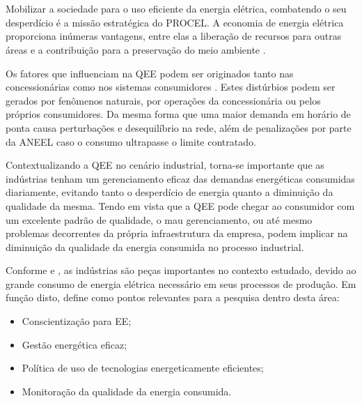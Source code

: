 \cleardoublepage
\pagestyle{fancy}
\setcounter{page}{9}
\chapter{\capum}\label{intro}
\par
Mobilizar a sociedade para o uso eficiente da energia elétrica, combatendo o seu desperdício é a missão estratégica do \ac{PROCEL}. A economia de energia elétrica proporciona inúmeras vantagens, entre elas a liberação de recursos para outras áreas e a contribuição para a preservação do meio ambiente \cite{ELE10}.
\par
Os fatores que influenciam na \ac{QEE} podem ser originados tanto nas concessionárias como nos sistemas consumidores \cite{MEL08}. Estes distúrbios podem ser gerados por fenômenos naturais, por operações da concessionária ou pelos próprios consumidores. Da mesma forma que uma maior demanda em horário de ponta causa perturbações e desequilíbrio na rede, além de penalizações por parte da \ac{ANEEL} caso o consumo ultrapasse o limite contratado. 
\par
Contextualizando a \acl{QEE} no cenário industrial, torna-se importante que as indústrias tenham um gerenciamento eficaz das demandas energéticas consumidas diariamente, evitando tanto o desperdício de energia quanto a diminuição da qualidade da mesma. Tendo em vista que a QEE pode chegar ao consumidor com um excelente padrão de qualidade, o mau gerenciamento, ou até mesmo problemas decorrentes da própria infraestrutura da empresa, podem implicar na diminuição da qualidade da energia consumida no processo industrial. 
\par
Conforme \cite{SIL09} e \cite{SOL04}, as indústrias são peças importantes no contexto estudado, devido ao grande consumo de energia elétrica necessário em seus processos de produção. Em função disto, \cite{SOL04} define como pontos relevantes para a pesquisa dentro desta área:
\begin{itemize}
	\item Conscientização para \ac{EE};
	\item Gestão energética eficaz;
	\item Política de uso de tecnologias energeticamente eficientes;
	\item Monitoração da qualidade da energia consumida.
\end{itemize}
